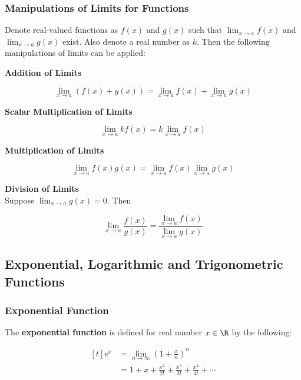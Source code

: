 \subsubsection{Manipulations of Limits for Functions}
\begin{thm}
  Denote real-valued functions as $f(x)$ and $g(x)$ such that $\lim_{x\to a}f(x)$ and $\lim_{x\to a}g(x)$ exist. Also denote a real number as $k$. Then the following manipulations of limits can be applied:

  \begin{alist}
    \item \textbf{Addition of Limits}

    $$\lim_{x\to a}(f(x)+g(x))=\lim_{x\to a}f(x)+\lim_{x\to a}g(x)$$

    \item \textbf{Scalar Multiplication of Limits}

    $$\lim_{x\to a}kf(x)=k\lim_{x\to a}f(x)$$

    \item \textbf{Multiplication of Limits}

    $$\lim_{x\to a}f(x)g(x)=\lim_{x\to a}f(x)\lim_{x\to a}g(x)$$

    \item \textbf{Division of Limits}\\
    Suppose $\lim_{x\to a}g(x)=0$. Then

    $$\lim_{x\to a}\frac{f(x)}{g(x)}=\frac{\lim_{x\to a}f(x)}{\lim_{x\to a}g(x)}$$
  \end{alist}
\end{thm}

\subsection{Exponential, Logarithmic and Trigonometric Functions}
\subsubsection{Exponential Function}
\begin{dft}
  The \textbf{exponential function} is defined for real number $x\in \R$ by the following:

  $$\begin{aligned}[t]
    e^{x}&=\lim_{n\to \infty}\left( 1+\frac{x}{n}\right)^{n}\\
    &=1+x+\frac{x^{2}}{2!}+\frac{x^{3}}{3!}+\frac{x^{4}}{4!}+\cdots
  \end{aligned}$$
\end{dft}\n

